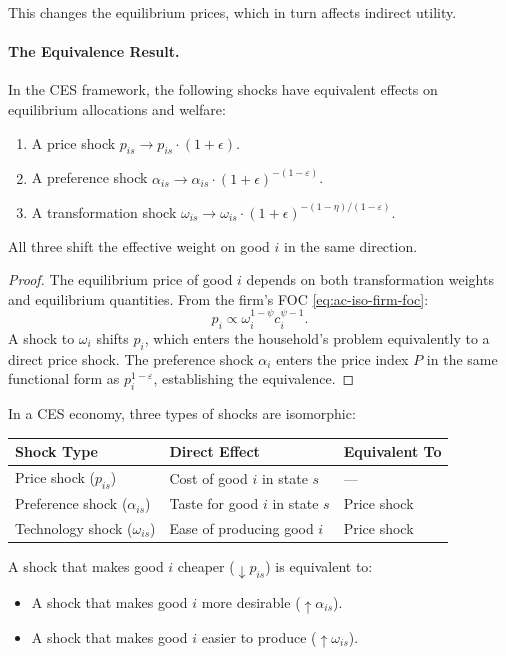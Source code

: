 This changes the equilibrium prices, which in turn affects indirect utility.

\paragraph{The Equivalence Result.}

\begin{proposition}
\label{prop:ac-iso-equivalence}
In the CES framework, the following shocks have equivalent effects on equilibrium allocations and welfare:
\begin{enumerate}[label=(\roman*), nosep]
\item A price shock $p_{is} \to p_{is} \cdot (1 + \epsilon)$.
\item A preference shock $\alpha_{is} \to \alpha_{is} \cdot (1 + \epsilon)^{-(1-\varepsilon)}$.
\item A transformation shock $\omega_{is} \to \omega_{is} \cdot (1 + \epsilon)^{-(1-\eta)/(1-\varepsilon)}$.
\end{enumerate}
All three shift the effective weight on good $i$ in the same direction.
\end{proposition}

\begin{proof}
The equilibrium price of good $i$ depends on both transformation weights and equilibrium quantities. From the firm's FOC \cref{eq:ac-iso-firm-foc}:
\[
p_i \propto \omega_i^{1-\psi} c_i^{\psi-1}.
\]
A shock to $\omega_i$ shifts $p_i$, which enters the household's problem equivalently to a direct price shock. The preference shock $\alpha_i$ enters the price index $P$ in the same functional form as $p_i^{1-\varepsilon}$, establishing the equivalence.
\end{proof}

\begin{calloutimportant}
In a CES economy, three types of shocks are isomorphic:
\begin{center}
\begin{tabular}{@{}lll@{}}
\toprule
\textbf{Shock Type} & \textbf{Direct Effect} & \textbf{Equivalent To} \\
\midrule
Price shock ($p_{is}$) & Cost of good $i$ in state $s$ & --- \\
Preference shock ($\alpha_{is}$) & Taste for good $i$ in state $s$ & Price shock \\
Technology shock ($\omega_{is}$) & Ease of producing good $i$ & Price shock \\
\bottomrule
\end{tabular}
\end{center}

A shock that makes good $i$ cheaper ($\downarrow p_{is}$) is equivalent to:
\begin{itemize}[nosep]
\item A shock that makes good $i$ more desirable ($\uparrow \alpha_{is}$).
\item A shock that makes good $i$ easier to produce ($\uparrow \omega_{is}$).
\end{itemize}
\end{calloutimportant}

